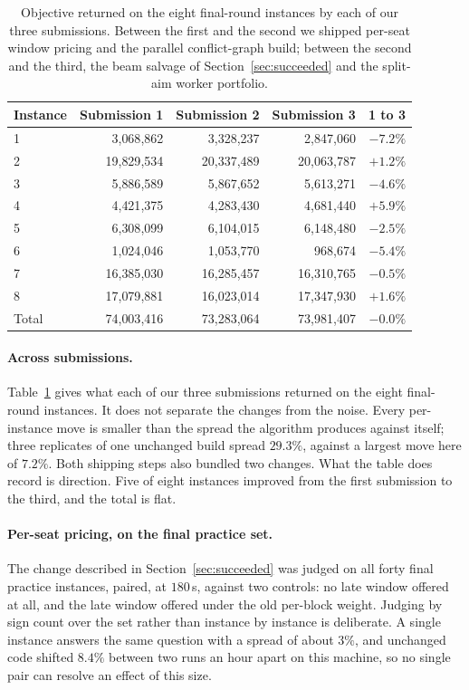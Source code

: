 \documentclass[runningheads]{llncs}
\begin{document}
\begin{table}[t]
\centering
\caption{Objective returned on the eight final-round instances by each of our three submissions.
Between the first and the second we shipped per-seat window pricing and the parallel
conflict-graph build; between the second and the third, the beam salvage of
Section~\ref{sec:succeeded} and the split-aim worker portfolio.}
\label{tab:subs}
\begin{tabular}{lrrrr}
\toprule
Instance & Submission 1 & Submission 2 & Submission 3 & 1 to 3 \\
\midrule
1     & 3{,}068{,}862  & 3{,}328{,}237  & 2{,}847{,}060  & $-7.2\%$ \\
2     & 19{,}829{,}534 & 20{,}337{,}489 & 20{,}063{,}787 & $+1.2\%$ \\
3     & 5{,}886{,}589  & 5{,}867{,}652  & 5{,}613{,}271  & $-4.6\%$ \\
4     & 4{,}421{,}375  & 4{,}283{,}430  & 4{,}681{,}440  & $+5.9\%$ \\
5     & 6{,}308{,}099  & 6{,}104{,}015  & 6{,}148{,}480  & $-2.5\%$ \\
6     & 1{,}024{,}046  & 1{,}053{,}770  & 968{,}674      & $-5.4\%$ \\
7     & 16{,}385{,}030 & 16{,}285{,}457 & 16{,}310{,}765 & $-0.5\%$ \\
8     & 17{,}079{,}881 & 16{,}023{,}014 & 17{,}347{,}930 & $+1.6\%$ \\
\midrule
Total & 74{,}003{,}416 & 73{,}283{,}064 & 73{,}981{,}407 & $-0.0\%$ \\
\bottomrule
\end{tabular}
\end{table}

\paragraph{Across submissions.}
Table~\ref{tab:subs} gives what each of our three submissions returned on the eight final-round
instances. It does not separate the changes from the noise. Every per-instance move is smaller than
the spread the algorithm produces against itself; three replicates of one unchanged build spread
$29.3\%$, against a largest move here of $7.2\%$. Both shipping steps also bundled two changes.
What the table does record is direction. Five of eight instances improved from the first submission
to the third, and the total is flat.

\paragraph{Per-seat pricing, on the final practice set.}
The change described in Section~\ref{sec:succeeded} was judged on all forty final practice
instances, paired, at $180$\,s, against two controls: no late window offered at all, and the late
window offered under the old per-block weight. Judging by sign count over the set rather than
instance by instance is deliberate. A single instance answers the same question with a spread of
about $3\%$, and unchanged code shifted $8.4\%$ between two runs an hour apart on this machine, so
no single pair can resolve an effect of this size.
\end{document}
